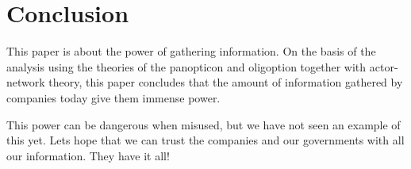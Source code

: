 \section{Conclusion}
This paper is about the power of gathering information. On the basis of the analysis using the theories of the panopticon and oligoption together with actor-network theory, this paper concludes that the amount of information gathered by companies today give them immense power.

This power can be dangerous when misused, but we have not seen an example of this yet. Lets hope that we can trust the companies and our governments with all our information. They have it all!
